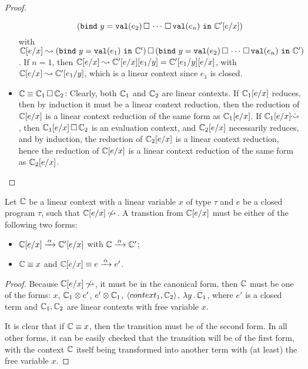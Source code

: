 \documentclass[10pt,a4]{article}
\begin{document}
\begin{proof}
\begin{itemize}
\[  (\mathtt{bind} \ {y} = {\mathtt{val}(e_2) \,\square\, \cdots \,\square\, \mathtt{val}(e_n)} \ \mathtt{in} \ {\mathbb{C}'[e/x]})
  \]
  with $\mathbb{C}[e/x] \leadsto (\mathtt{bind} \ {y} = {\mathtt{val}(e_1)} \ \mathtt{in} \ {\mathbb{C}'}) \,\square\, 
  (\mathtt{bind} \ {y} = {\mathtt{val}(e_2) \,\square\, \cdots \,\square\, \mathtt{val}(e_n)} \ \mathtt{in} \ {\mathbb{C}'})$.
  If $n = 1$, then $\mathbb{C}[e/x] \leadsto \mathbb{C}'[e/x][e_1/y] = \mathbb{C}'[e_1/y][e/x]$, 
  with $\mathbb{C}[e/x] \leadsto \mathbb{C}'[e_1/y]$, which is a linear context since $e_1$ is closed.
\item $\mathbb{C} \equiv \mathbb{C}_1 \,\square\, \mathbb{C}_2$:  
  Clearly, both $\mathbb{C}_1$ and $\mathbb{C}_2$ are linear contexts. If $\mathbb{C}_1[e/x]$ reduces, then by induction 
  it must be a linear context reduction, then the reduction of $\mathbb{C}[e/x]$ is a linear context reduction of the 
  same form as $\mathbb{C}_1[e/x]$.
  If $\mathbb{C}_1[e/x] \dot {\leadsto}$, then $\mathbb{C}_1[e/x] \,\square\, \mathbb{C}_2$ is an evaluation context, and 
  $\mathbb{C}_2[e/x]$ necessarily reduces, and by induction, the reduction of $\mathbb{C}_2[e/x]$ is a linear context 
  reduction, hence the reduction of $\mathbb{C}[e/x]$ is a linear context reduction of the same form as $\mathbb{C}_2[e/x]$.
\end{itemize}
\end{proof}

\begin{lemma}
\label{lem:lc-trans}
Let $\mathbb{C}$ be a linear context with a linear variable $x$ of type $\tau$ and $e$ be a closed program $\tau$, 
such that $\mathbb{C}[e/x] \not\leadsto$. A transtion from $\mathbb{C}[e/x]$ must be either of 
the following two forms:
\begin{itemize}
\item $\mathbb{C}[e/x] \xrightarrow{\,{\alpha}\,} \mathbb{C}'[e/x]$ with $\mathbb{C} \xrightarrow{\,{\alpha}\,} \mathbb{C}'$;
\item $\mathbb{C} \equiv x$ and $\mathbb{C}[e/x] \equiv e \xrightarrow{\,{\alpha}\,} e'$.
\end{itemize}
\end{lemma}
%
\begin{proof}
Because $\mathbb{C}[e/x] \not\leadsto$, it must be in the canonical form, then $\mathbb{C}$ must be one of the forms:
$x$, $\mathbb{C}_1 \otimes e'$, $e' \otimes \mathbb{C}_1$, $\langle{context_1, \mathbb{C}_2}\rangle$, $\lambda y \, . \, \mathbb{C}_1$, 
where $e'$ is a closed term and $\mathbb{C}_1, \mathbb{C}_2$ are linear contexts with free variable $x$.

It is clear that if $\mathbb{C} \equiv x$, then the transition must be of the second form. 
In all other forms, it can be easily checked that the transition will be of the first form, with the context 
$\mathbb{C}$ itself being transformed into another term with (at least) the free variable $x$.
\end{proof}
\end{document}
